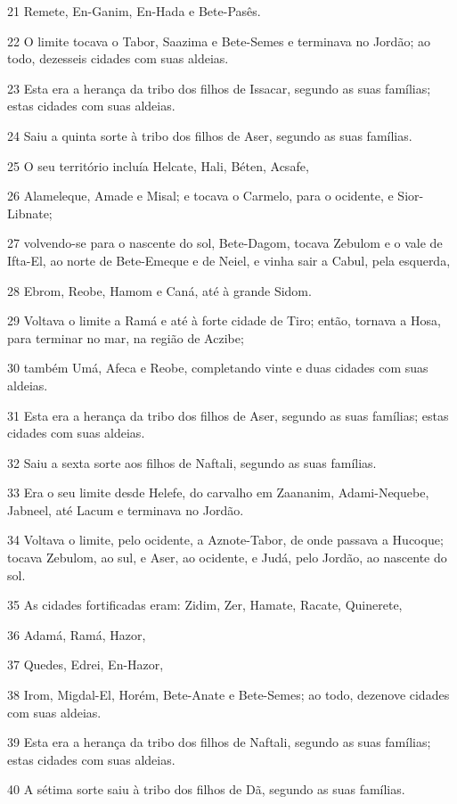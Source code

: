 \par 21 Remete, En-Ganim, En-Hada e Bete-Pasês.
\par 22 O limite tocava o Tabor, Saazima e Bete-Semes e terminava no Jordão; ao todo, dezesseis cidades com suas aldeias.
\par 23 Esta era a herança da tribo dos filhos de Issacar, segundo as suas famílias; estas cidades com suas aldeias.
\par 24 Saiu a quinta sorte à tribo dos filhos de Aser, segundo as suas famílias.
\par 25 O seu território incluía Helcate, Hali, Béten, Acsafe,
\par 26 Alameleque, Amade e Misal; e tocava o Carmelo, para o ocidente, e Sior-Libnate;
\par 27 volvendo-se para o nascente do sol, Bete-Dagom, tocava Zebulom e o vale de Ifta-El, ao norte de Bete-Emeque e de Neiel, e vinha sair a Cabul, pela esquerda,
\par 28 Ebrom, Reobe, Hamom e Caná, até à grande Sidom.
\par 29 Voltava o limite a Ramá e até à forte cidade de Tiro; então, tornava a Hosa, para terminar no mar, na região de Aczibe;
\par 30 também Umá, Afeca e Reobe, completando vinte e duas cidades com suas aldeias.
\par 31 Esta era a herança da tribo dos filhos de Aser, segundo as suas famílias; estas cidades com suas aldeias.
\par 32 Saiu a sexta sorte aos filhos de Naftali, segundo as suas famílias.
\par 33 Era o seu limite desde Helefe, do carvalho em Zaananim, Adami-Nequebe, Jabneel, até Lacum e terminava no Jordão.
\par 34 Voltava o limite, pelo ocidente, a Aznote-Tabor, de onde passava a Hucoque; tocava Zebulom, ao sul, e Aser, ao ocidente, e Judá, pelo Jordão, ao nascente do sol.
\par 35 As cidades fortificadas eram: Zidim, Zer, Hamate, Racate, Quinerete,
\par 36 Adamá, Ramá, Hazor,
\par 37 Quedes, Edrei, En-Hazor,
\par 38 Irom, Migdal-El, Horém, Bete-Anate e Bete-Semes; ao todo, dezenove cidades com suas aldeias.
\par 39 Esta era a herança da tribo dos filhos de Naftali, segundo as suas famílias; estas cidades com suas aldeias.
\par 40 A sétima sorte saiu à tribo dos filhos de Dã, segundo as suas famílias.
